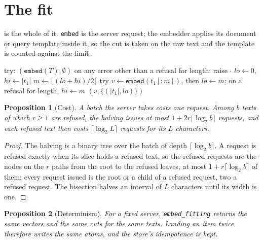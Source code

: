\documentclass[11pt]{article}
\theoremstyle{plain}
\newtheorem{proposition}{Proposition}
\theoremstyle{remark}
\newcommand{\code}[1]{\texttt{#1}}
\begin{document}
\section{The fit}\label{sec:fit}

 is the whole of it. \code{embed} is the server request; the embedder applies its
document or query template inside it, so the cut is taken on the raw text and the template is
counted against the limit.

\begin{algorithm}[t]
\caption{\code{embed\_fitting}, in \code{core/ingest/embed.py}.}\label{alg:fit}
\begin{algorithmic}[1]
  \State try: \Return $(\code{embed}(T), \emptyset)$ 
  \State on any error other than a refusal for length: raise
    \State \Return {} $\cdot$ 
  \EndIf
  \State $lo \gets 0$, $hi \gets |t_1|$ 
    \State $m \gets \lfloor (lo + hi)/2 \rfloor$
    \State try $v \gets \code{embed}(t_1[{:}m])$, then $lo \gets m$; on a refusal for length, $hi \gets m$
  \EndWhile
  \State \Return $(v, \{(|t_1|, lo)\})$ 
\EndFunction
\end{algorithmic}
\end{algorithm}

\begin{proposition}[Cost]\label{prop:cost}
A batch the server takes costs one request. Among $b$ texts of which $r \ge 1$ are refused, the
halving issues at most $1 + 2r\lceil\log_2 b\rceil$ requests, and each refused text then costs
$\lceil\log_2 L\rceil$ requests for its $L$ characters.
\end{proposition}

\begin{proof}
The halving is a binary tree over the batch of depth $\lceil\log_2 b\rceil$. A request is refused
exactly when its slice holds a refused text, so the refused requests are the nodes on the $r$ paths
from the root to the refused leaves, at most $1 + r\lceil\log_2 b\rceil$ of them; every request
issued is the root or a child of a refused request, two a refused request. The bisection halves an
interval of $L$ characters until its width is one.
\end{proof}

\begin{proposition}[Determinism]\label{prop:det}
For a fixed server, \code{embed\_fitting} returns the same vectors and the same cuts for the
same texts.
Landing an item twice therefore writes the same atoms, and the store's idempotence is kept.
\end{proposition}
\end{document}
